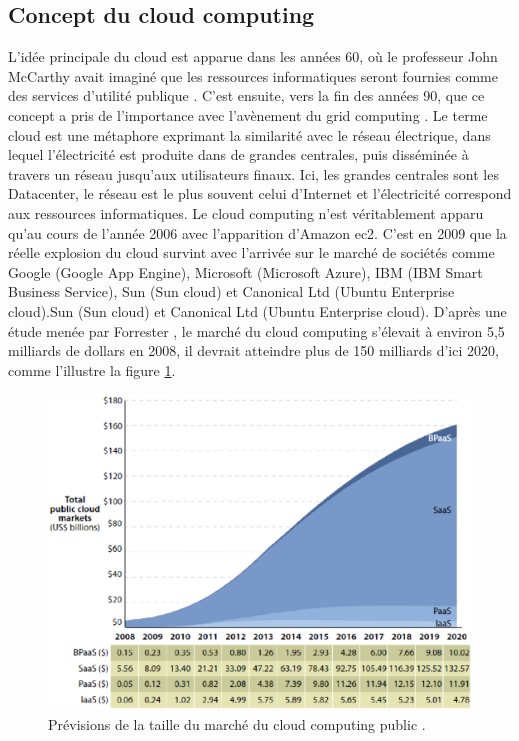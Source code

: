     \subsection{Concept du cloud computing}
  L'idée principale du cloud est apparue dans les années 60, où le professeur John McCarthy avait imaginé que les ressources informatiques seront fournies comme des services d’utilité publique \parencite{Garfinkel}. C'est ensuite, vers la fin des années 90, que ce concept a pris de l'importance avec l’avènement du grid computing  \parencite{Foster}. Le terme cloud est une métaphore exprimant la similarité avec le réseau électrique, dans lequel l'électricité est produite dans de grandes centrales, puis disséminée à travers un réseau jusqu'aux utilisateurs finaux. Ici, les grandes centrales sont les Datacenter, le réseau est le plus souvent celui d'Internet et l'électricité correspond aux ressources informatiques. Le cloud computing  n'est véritablement apparu qu'au cours de l’année 2006 \parencite{Vouk2008} avec l'apparition d'Amazon \ac{ec2}. C'est en 2009 que la réelle explosion du cloud survint avec l'arrivée sur le marché de sociétés comme Google (Google App Engine), Microsoft (Microsoft Azure), IBM (IBM Smart Business Service), Sun (Sun cloud) et Canonical Ltd (Ubuntu Enterprise cloud).Sun (Sun cloud) et Canonical Ltd (Ubuntu Enterprise cloud). D'après une étude menée par Forrester \parencite{Ried}, le marché du cloud computing  s'élevait à environ 5,5 milliards de dollars en 2008, il devrait atteindre plus de 150 milliards d'ici 2020, comme l’illustre la figure \ref{fig:tempsnip4}. 
    
    \begin{figure}[h]
    	\centering
    	\includegraphics[width=0.8\linewidth]{images/tempsnip4}
    	\caption{Prévisions de la taille du marché du cloud computing  public \parencite{Ried}.}
    	\label{fig:tempsnip4}
    \end{figure}
